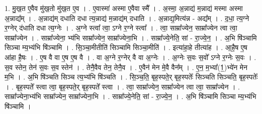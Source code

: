 \documentclass[17pt]{extarticle}
\begin{document}
1. मु॒ख॒त ए॒वैव मु॑ख॒तो मु॑ख॒त ए॒व । . ए॒वास्मा॑ अस्मा ए॒वैवा स्मै᳚ । . अ॒स्मा॒ अ॒न्नाद्य॑ म॒न्नाद्य॑ मस्मा अस्मा अ॒न्नाद्य᳚म् । . अ॒न्नाद्य॑म् दधाति दधा त्य॒न्नाद्य॑ म॒न्नाद्य॑म् दधाति । . अ॒न्नाद्य॒मित्य॑न्न - अद्य᳚म् । . द॒धा॒ त्य॒ग्ने र॒ग्नेर् द॑धाति दधा त्य॒ग्नेः । . अ॒ग्ने स्त्वा᳚ त्वा॒ ऽग्ने र॒ग्ने स्त्वा᳚ । . त्वा॒ साम्रा᳚ज्येन॒ साम्रा᳚ज्येन त्वा त्वा॒ साम्रा᳚ज्येन । . साम्रा᳚ज्येना॒ भ्य॑भि साम्रा᳚ज्येन॒ साम्रा᳚ज्येना॒भि । . साम्रा᳚ज्ये॒नेति॒ सां - रा॒ज्ये॒न॒ । . अ॒भि षि॑ञ्चामि सिञ्चा म्य॒भ्य॑भि षि॑ञ्चामि । . सि॒ञ्चा॒मीतीति॑ सिञ्चामि सिञ्चा॒मीति॑ । . इत्या॑हा॒हे तीत्या॑ह । . आ॒है॒ष ए॒ष आ॑हा है॒षः । . ए॒ष वै वा ए॒ष ए॒ष वै । . वा अ॒ग्ने र॒ग्नेर् वै वा अ॒ग्नेः । . अ॒ग्नेः स॒वः स॒वो᳚ ऽग्ने र॒ग्नेः स॒वः । . स॒व स्तेन॒ तेन॑ स॒वः स॒व स्तेन॑ । . तेनै॒वैव तेन॒ तेनै॒व । . ए॒वैन॑ मेन मे॒वै वैन᳚म् । . ए॒न॒ म॒भ्या᳚(1॒)भ्ये॑न मेन म॒भि । . अ॒भि षि॑ञ्चति सिञ्च त्य॒भ्य॑भि षि॑ञ्चति । . सि॒ञ्च॒ति॒ बृह॒स्पते॒र् बृह॒स्पतेः᳚ सिञ्चति सिञ्चति॒ बृह॒स्पतेः᳚ । . बृह॒स्पते᳚ स्त्वा त्वा॒ बृह॒स्पते॒र् बृह॒स्पते᳚ स्त्वा । . त्वा॒ साम्रा᳚ज्येन॒ साम्रा᳚ज्येन त्वा त्वा॒ साम्रा᳚ज्येन । . साम्रा᳚ज्येना॒भ्य॑भि साम्रा᳚ज्येन॒ साम्रा᳚ज्येना॒भि । . साम्रा᳚ज्ये॒नेति॒ सां - रा॒ज्ये॒न॒ । . अ॒भि षि॑ञ्चामि सिञ्चा म्य॒भ्य॑भि षि॑ञ्चामि । \newline
\end{document}
